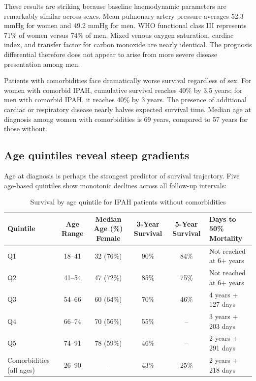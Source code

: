 \documentclass[11pt,a4paper]{article}
\begin{document}
These results are striking because baseline haemodynamic parameters are remarkably similar across sexes. Mean pulmonary artery pressure averages 52.3 mmHg for women and 49.2 mmHg for men. WHO functional class III represents 71\% of women versus 74\% of men. Mixed venous oxygen saturation, cardiac index, and transfer factor for carbon monoxide are nearly identical. The prognosis differential therefore does not appear to arise from more severe disease presentation among men.

Patients with comorbidities face dramatically worse survival regardless of sex. For women with comorbid IPAH, cumulative survival reaches 40\% by 3.5 years; for men with comorbid IPAH, it reaches 40\% by 3 years. The presence of additional cardiac or respiratory disease nearly halves expected survival time. Median age at diagnosis among women with comorbidities is 69 years, compared to 57 years for those without.

\subsection{Age quintiles reveal steep gradients}

Age at diagnosis is perhaps the strongest predictor of survival trajectory. Five age-based quintiles show monotonic declines across all follow-up intervals:

\begin{table}[H]
\centering
\small
\caption{Survival by age quintile for IPAH patients without comorbidities}
\begin{tabularx}{\textwidth}{lccccY}
\toprule
Quintile & Age Range & Median Age (\%) Female & 3-Year Survival & 5-Year Survival & Days to 50\% Mortality \\
\midrule
Q1 & 18--41 & 32 (76\%) & 90\% & 84\% & Not reached at 6+ years \\
Q2 & 41--54 & 47 (72\%) & 85\% & 75\% & Not reached at 6+ years \\
Q3 & 54--66 & 60 (64\%) & 70\% & 46\% & 4 years + 127 days \\
Q4 & 66--74 & 70 (56\%) & 55\% & -- & 3 years + 203 days \\
Q5 & 74--91 & 78 (59\%) & 46\% & -- & 2 years + 291 days \\
Comorbidities (all ages) & 26--90 & -- & 43\% & 25\% & 2 years + 218 days \\
\bottomrule
\end{tabularx}
\end{table}
\end{document}

